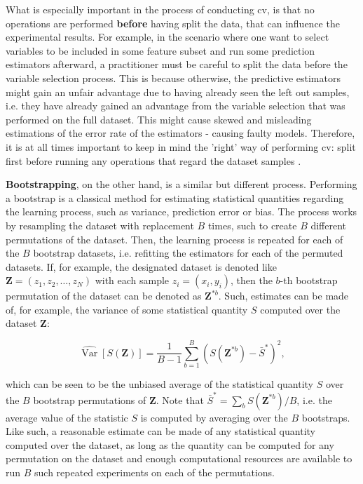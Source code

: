 \documentclass{article}
\begin{document}
What is especially important in the process of conducting \gls{cv}, is that no operations are performed \textbf{before} having split the data, that can influence the experimental results. For example, in the scenario where one want to select variables to be included in some feature subset and run some prediction estimators afterward, a practitioner must be careful to split the data before the variable selection process. This is because otherwise, the predictive estimators might gain an unfair advantage due to having already seen the left out samples, i.e. they have already gained an advantage from the variable selection that was performed on the full dataset. This might cause skewed and misleading estimations of the error rate of the estimators - causing faulty models. Therefore, it is at all times important to keep in mind the 'right' way of performing \gls{cv}: split first before running any operations that regard the dataset samples \citep{ambroise_selection_2002}.

\textbf{Bootstrapping}, on the other hand, is a similar but different process. Performing a bootstrap is a classical method for estimating statistical quantities regarding the learning process, such as variance, prediction error or bias. The process works by resampling the dataset with replacement $B$ times, such to create $B$ different permutations of the dataset. Then, the learning process is repeated for each of the $B$ bootstrap datasets, i.e. refitting the estimators for each of the permuted datasets. If, for example, the designated dataset is denoted like $\mathbf{Z}=\left(z_{1}, z_{2}, \ldots, z_{N}\right)$ with each sample $z_{i}=\left(x_{i}, y_{i}\right)$, then the $b$-th bootstrap permutation of the dataset can be denoted as $\mathbf{Z}^{* b}$. Such, estimates can be made of, for example, the variance of some statistical quantity $S$ computed over the dataset $\mathbf{Z}$:

\begin{equation}
\widehat{\operatorname{Var}}[S(\mathbf{Z})]=\frac{1}{B-1} \sum_{b=1}^{B}\left(S\left(\mathbf{Z}^{* b}\right)-\bar{S}^{*}\right)^{2},
\end{equation}

which can be seen to be the unbiased average of the statistical quantity $S$ over the $B$ bootstrap permutations of $\mathbf{Z}$. Note that $\bar{S}^{*}=\sum_{b} S\left(\mathbf{Z}^{* b}\right) / B$, i.e. the average value of the statistic $S$ is computed by averaging over the $B$ bootstraps. Like such, a reasonable estimate can be made of any statistical quantity computed over the dataset, as long as the quantity can be computed for any permutation on the dataset and enough computational resources are available to run $B$ such repeated experiments on each of the permutations.
\end{document}
